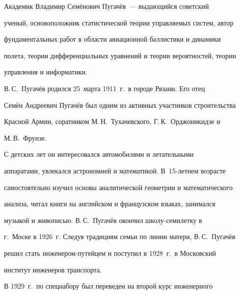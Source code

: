       \thispagestyle{headings}







      


            \label{st\stat}


     


     Академик Владимир Семёнович Пугачёв~--- выдающийся советский 


ученый, основоположник статистической теории управляемых систем, автор 


фундаментальных работ в области авиационной баллистики и динамики 


полета, теории дифференциальных уравнений и теории вероятностей, теории 


управления и информатики.


     


     В.\,С.~Пугачёв родился 25~марта 1911~г.\ в городе Рязани. Его отец 


Семён Андреевич Пугачёв был одним из активных участников строительства 


Красной Армии, соратником М.\,Н.~Тухачевского, Г.\,К.~Орджоникидзе и 


М.\,В.~Фрунзе.


     


     С детских лет он интересовался автомобилями и летательными 


аппаратами, увлекался астрономией и математикой. В~15-лет\-нем возрасте 


самостоятельно \mbox{изучил} основы аналитической геометрии и математического 


анализа, читал книги на английском и французском языках, занимался 


музыкой и живописью. В.\,С.~Пугачёв окончил шко\-лу-се\-ми\-лет\-ку в 


г.~Моске в 1926~г. Следуя традициям семьи по линии матери, В.\,С.~Пугачёв 


решил стать ин\-же\-не\-ром-пу\-тей\-цем и поступил в 1928~г.\ в Московский 


институт инженеров транспорта. 


     


     В 1929~г.\ по спецнабору был переведен на второй курс инженерного 


